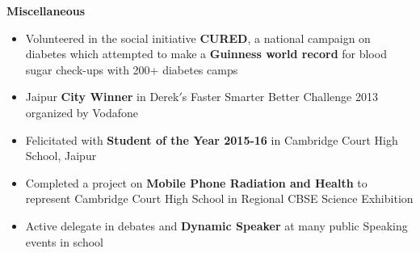 \documentclass[11pt]{article}%
\begin{document}
\vspace{-0.6cm}

{\flushleft \bf \large{Miscellaneous}}
\begin{itemize}
    
    \vspace{-0.2cm}
    \item Volunteered in the social initiative \textbf{CURED}, a national campaign on diabetes which attempted to make a \textbf{Guinness world record} for blood sugar check-ups with 200+ diabetes camps
    \vspace{-0.2cm}
    \item Jaipur \textbf{City Winner} in Derek$'$s Faster Smarter Better Challenge 2013 organized by Vodafone
    \vspace{-0.2cm}
    \item Felicitated with \textbf{Student of the Year 2015-16} in Cambridge Court High School, Jaipur
    \vspace{-0.2cm}
    \item \nohyphens{Completed a project on \textbf{Mobile Phone Radiation and Health} to represent Cambridge Court High School in Regional CBSE Science Exhibition}
    \vspace{-0.2cm}
    \item Active delegate in debates and \textbf{Dynamic Speaker} at many public Speaking events in school
\end{itemize}
\end{document}
